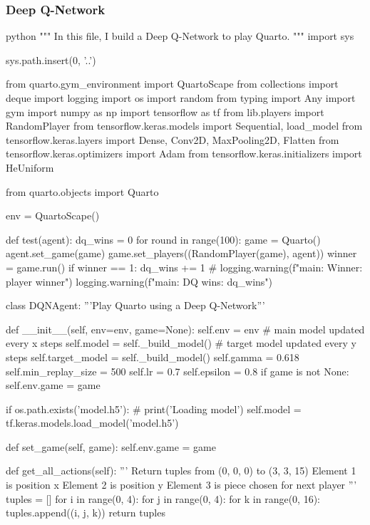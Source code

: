 \subsubsection{Deep Q-Network}

\begin{mintedbox}{python}
"""
In this file, I build a Deep Q-Network to play Quarto.
"""
import sys

sys.path.insert(0, '..')

from quarto.gym_environment import QuartoScape
from collections import deque
import logging
import os
import random
from typing import Any
import gym
import numpy as np
import tensorflow as tf
from lib.players import RandomPlayer
from tensorflow.keras.models import Sequential, load_model
from tensorflow.keras.layers import Dense, Conv2D, MaxPooling2D, Flatten
from tensorflow.keras.optimizers import Adam
from tensorflow.keras.initializers import HeUniform

from quarto.objects import Quarto

env = QuartoScape()


def test(agent):
    dq_wins = 0
    for round in range(100):
        game = Quarto()
        agent.set_game(game)
        game.set_players((RandomPlayer(game), agent))
        winner = game.run()
        if winner == 1:
            dq_wins += 1
        # logging.warning(f"main: Winner: player {winner}")
    logging.warning(f"main: DQ wins: {dq_wins}")


class DQNAgent:
    '''Play Quarto using a Deep Q-Network'''

    def __init__(self, env=env, game=None):
        self.env = env
        # main model updated every x steps
        self.model = self._build_model()
        # target model updated every y steps
        self.target_model = self._build_model()
        self.gamma = 0.618
        self.min_replay_size = 500
        self.lr = 0.7
        self.epsilon = 0.8
        if game is not None:
            self.env.game = game

        if os.path.exists('model.h5'):
            # print('Loading model')
            self.model = tf.keras.models.load_model('model.h5')

    def set_game(self, game):
        self.env.game = game

    def get_all_actions(self):
        '''
        Return tuples from (0, 0, 0) to (3, 3, 15)
        Element 1 is position x
        Element 2 is position y
        Element 3 is piece chosen for next player
        '''
        tuples = []
        for i in range(0, 4):
            for j in range(0, 4):
                for k in range(0, 16):
                    tuples.append((i, j, k))
        return tuples


\end{mintedbox}
